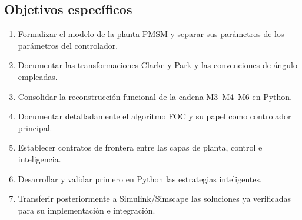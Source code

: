 \subsection{Objetivos específicos}
\begin{enumerate}[label=\arabic*.]
  \item Formalizar el modelo de la planta PMSM y separar sus parámetros de los parámetros del controlador.
  \item Documentar las transformaciones Clarke y Park y las convenciones de ángulo empleadas.
  \item Consolidar la reconstrucción funcional de la cadena M3--M4--M6 en Python.
  \item Documentar detalladamente el algoritmo FOC y su papel como controlador principal.
  \item Establecer contratos de frontera entre las capas de planta, control e inteligencia.
  \item Desarrollar y validar primero en Python las estrategias inteligentes.
  \item Transferir posteriormente a Simulink/Simscape las soluciones ya verificadas para su implementación e integración.
\end{enumerate}
